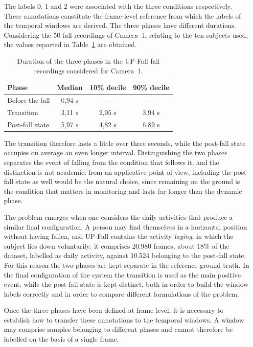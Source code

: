 The labels $0$, $1$ and $2$ were associated with the three conditions respectively. These annotations constitute the frame-level reference from which the labels of the temporal windows are derived. The three phases have different durations. Considering the 50 fall recordings of Camera~1, relating to the ten subjects used, the values reported in Table~\ref{tab:durate_fasi} are obtained.

\begin{table}[ht]
\centering
\caption{Duration of the three phases in the UP-Fall fall recordings considered for Camera~1.}
\label{tab:durate_fasi}
\begin{tabular}{lccc}
\hline
\textbf{Phase} & \textbf{Median} & \textbf{10\% decile} & \textbf{90\% decile} \\
\hline
Before the fall & 0,94 s & --- & --- \\
Transition & 3,11 s & 2,05 s & 3,94 s \\
Post-fall state & 5,97 s & 4,82 s & 6,89 s \\
\hline
\end{tabular}
\end{table}

The transition therefore lasts a little over three seconds, while the post-fall state occupies on average an even longer interval. Distinguishing the two phases separates the event of falling from the condition that follows it, and the distinction is not academic: from an applicative point of view, including the post-fall state as well would be the natural choice, since remaining on the ground is the condition that matters in monitoring and lasts far longer than the dynamic phase.

The problem emerges when one considers the daily activities that produce a similar final configuration. A person may find themselves in a horizontal position without having fallen, and UP-Fall contains the activity \emph{laying}, in which the subject lies down voluntarily: it comprises 20.980 frames, about 18\% of the dataset, labelled as daily activity, against 10.524 belonging to the post-fall state.
For this reason the two phases are kept separate in the reference ground truth. In the final configuration of the system the transition is used as the main positive event, while the post-fall state is kept distinct, both in order to build the window labels correctly and in order to compare different formulations of the problem.

Once the three phases have been defined at frame level, it is necessary to establish how to transfer these annotations to the temporal windows. A window may comprise samples belonging to different phases and cannot therefore be labelled on the basis of a single frame.

